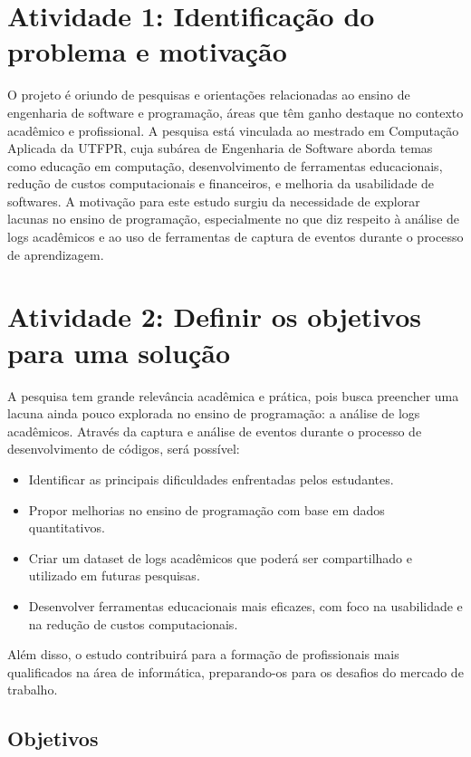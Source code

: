\documentclass[12pt,a4paper]{article}
\begin{document}
	\section{Atividade 1: Identificação do problema e motivação}
	
	O projeto é oriundo de pesquisas e orientações relacionadas ao ensino de engenharia de software e programação, áreas que têm ganho destaque no contexto acadêmico e profissional. A pesquisa está vinculada ao mestrado em Computação Aplicada da UTFPR, cuja subárea de Engenharia de Software aborda temas como educação em computação, desenvolvimento de ferramentas educacionais, redução de custos computacionais e financeiros, e melhoria da usabilidade de softwares. A motivação para este estudo surgiu da necessidade de explorar lacunas no ensino de programação, especialmente no que diz respeito à análise de logs acadêmicos e ao uso de ferramentas de captura de eventos durante o processo de aprendizagem.
	
	\section{Atividade 2: Definir os objetivos para uma solução} 
	
	A pesquisa tem grande relevância acadêmica e prática, pois busca preencher uma lacuna ainda pouco explorada no ensino de programação: a análise de logs acadêmicos. Através da captura e análise de eventos durante o processo de desenvolvimento de códigos, será possível:
\begin{itemize}
	\item  Identificar as principais dificuldades enfrentadas pelos estudantes.
	\item Propor melhorias no ensino de programação com base em dados quantitativos.
	\item Criar um dataset de logs acadêmicos que poderá ser compartilhado e utilizado em futuras pesquisas.
	\item Desenvolver ferramentas educacionais mais eficazes, com foco na usabilidade e na redução de custos computacionais.
	
\end{itemize}
	Além disso, o estudo contribuirá para a formação de profissionais mais qualificados na área de informática, preparando-os para os desafios do mercado de trabalho.
	
	\subsection{Objetivos}
	 
\end{document}
